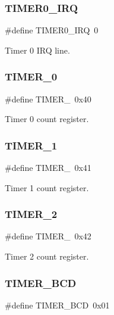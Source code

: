 \subsubsection{\texorpdfstring{TIMER0\_IRQ}{TIMER0\_IRQ}}
{\footnotesize\ttfamily \#define T\+I\+M\+E\+R0\+\_\+\+I\+RQ~0}



Timer 0 I\+RQ line. 

\mbox{\label{group__i8254_gacc9ff9df4a9674a1ce9ba08fc4a4679e}} 
\subsubsection{\texorpdfstring{TIMER\_0}{TIMER\_0}}
{\footnotesize\ttfamily \#define T\+I\+M\+E\+R\+\_~0x40}



Timer 0 count register. 

\mbox{\label{group__i8254_gac62c99c2a9289891c1b83052242cca49}} 
\subsubsection{\texorpdfstring{TIMER\_1}{TIMER\_1}}
{\footnotesize\ttfamily \#define T\+I\+M\+E\+R\+\_~0x41}



Timer 1 count register. 

\mbox{\label{group__i8254_ga1f34f18ad0ab8cace46b615773b48735}} 
\subsubsection{\texorpdfstring{TIMER\_2}{TIMER\_2}}
{\footnotesize\ttfamily \#define T\+I\+M\+E\+R\+\_~0x42}



Timer 2 count register. 

\mbox{\label{group__i8254_ga325b992a371d5d981c4eceff42fa5956}} 
\subsubsection{\texorpdfstring{TIMER\_BCD}{TIMER\_BCD}}
{\footnotesize\ttfamily \#define T\+I\+M\+E\+R\+\_\+\+B\+CD~0x01}



